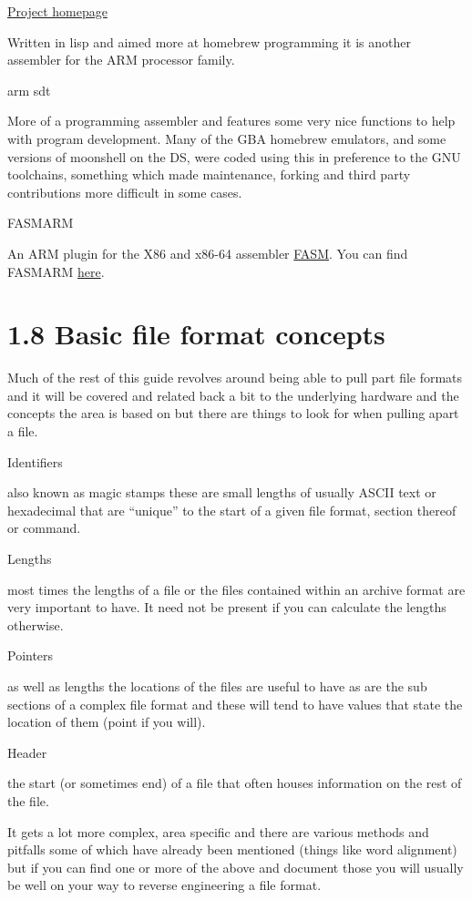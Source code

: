 \documentclass[
]{book}
\begin{document}
\href{http://common-lisp.net/project/armish/}{Project homepage}

Written in lisp and aimed more at homebrew programming it is another assembler for the ARM processor family.

arm sdt

More of a programming assembler and features some very nice functions to help with program development. Many of the GBA homebrew emulators, and some versions of moonshell on the DS, were coded using this in preference to the GNU toolchains, something which made maintenance, forking and third party contributions more difficult in some cases.

FASMARM

An ARM plugin for the X86 and x86-64 assembler \href{http://flatassembler.net/}{FASM}. You can find FASMARM \href{http://arm.flatassembler.net/}{here}.

\hypertarget{basic-file-format-concepts}{%
\section{1.8 Basic file format concepts}\label{basic-file-format-concepts}}

Much of the rest of this guide revolves around being able to pull part file formats and it will be covered and related back a bit to the underlying hardware and the concepts the area is based on but there are things to look for when pulling apart a file.

Identifiers

also known as magic stamps these are small lengths of usually ASCII text or hexadecimal that are ``unique'' to the start of a given file format, section thereof or command.

Lengths

most times the lengths of a file or the files contained within an archive format are very important to have. It need not be present if you can calculate the lengths otherwise.

Pointers

as well as lengths the locations of the files are useful to have as are the sub sections of a complex file format and these will tend to have values that state the location of them (point if you will).

Header

the start (or sometimes end) of a file that often houses information on the rest of the file.

It gets a lot more complex, area specific and there are various methods and pitfalls some of which have already been mentioned (things like word alignment) but if you can find one or more of the above and document those you will usually be well on your way to reverse engineering a file format.
\end{document}
